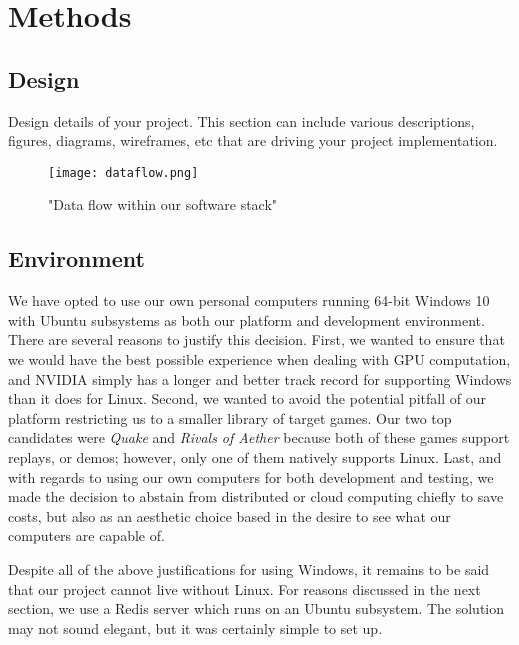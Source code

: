 \chapter{Methods}


\section{Design}

Design details of your project. This section can include various descriptions, figures, diagrams, wireframes, etc that are driving your project implementation.

\begin{figure}
	\caption{"Data flow within our software stack"}
	\centering
		\texttt{[image: dataflow.png]} \\
\end{figure}




\section{Environment}

We have opted to use our own personal computers running 64-bit Windows 10 with Ubuntu subsystems as both our platform and development environment. There are several reasons to justify this decision. First, we wanted to ensure that we would have the best possible experience when dealing with GPU computation, and NVIDIA simply has a longer and better track record for supporting Windows than it does for Linux. Second, we wanted to avoid the potential pitfall of our platform restricting us to a smaller library of target games. Our two top candidates were {\it Quake} and {\it Rivals of Aether} because both of these games support replays, or demos; however, only one of them natively supports Linux. Last, and with regards to using our own computers for both development and testing, we made the decision to abstain from distributed or cloud computing chiefly to save costs, but also as an aesthetic choice based in the desire to see what our computers are capable of.

Despite all of the above justifications for using Windows, it remains to be said that our project cannot live without Linux. For reasons discussed in the next section, we use a Redis server which runs on an Ubuntu subsystem. The solution may not sound elegant, but it was certainly simple to set up.

